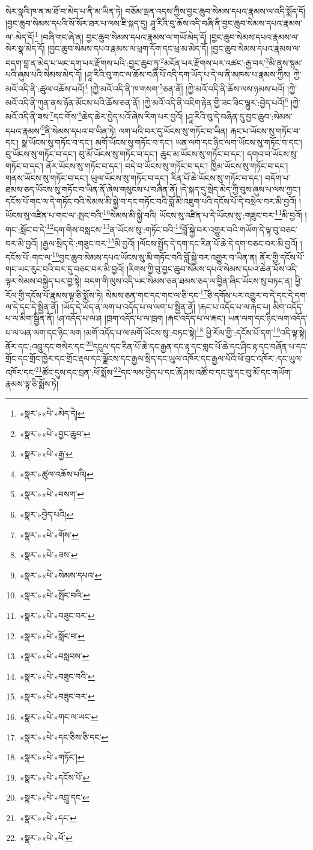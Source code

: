 སེར་སྣའི་ཁ་ན་མ་ཐོ་བ་མེད་པ་ནི་མ་ཡིན་ཏེ། བཅོམ་ལྡན་འདས་ཀྱིས་བྱང་ཆུབ་སེམས་དཔའ་རྣམས་ལ་འདི་སྨོད་དོ། །བྱང་ཆུབ་སེམས་དཔའི་སོ་སོར་ཐར་པ་ལས་ཇི་སྐད་དུ། ཤཱ་རིའི་བུ་ཆོས་འདི་བཞི་ནི་བྱང་ཆུབ་སེམས་དཔའ་རྣམས་ལ་:མེད་དོ།\footnote{«སྣར་»«པེ་»མེད་དེ།} །བཞི་གང་ཞེ་ན། བྱང་ཆུབ་སེམས་དཔའ་རྣམས་ལ་གཡོ་མེད་དོ། །བྱང་ཆུབ་སེམས་དཔའ་རྣམས་ལ་སེར་སྣ་མེད་དོ། །བྱང་ཆུབ་སེམས་དཔའ་རྣམས་ལ་ཕྲག་དོག་དང་ཕྲ་མ་མེད་དོ། །བྱང་ཆུབ་སེམས་དཔའ་རྣམས་ལ་བདག་བླ་ན་མེད་པ་ཡང་དག་པར་རྫོགས་པའི་:བྱང་ཆུབ་ཏུ་\footnote{«སྣར་»«པེ་»བྱང་ཆུབ་}མངོན་པར་རྫོགས་པར་འཚང་:རྒྱ་བར་\footnote{«སྣར་»«པེ་»རྒྱ་}མི་ནུས་སྙམ་པའི་ཞུམ་པའི་སེམས་མེད་དོ། །ཤཱ་རིའི་བུ་གང་ལ་ཆོས་བཞི་པོ་འདི་དག་ཡོད་པ་དེ་ལ་ནི་མཁས་པ་རྣམས་ཀྱིས། ཀྱེ་མའོ་འདི་ནི་:ཚུལ་འཆོས་པའོ།\footnote{«སྣར་»ཚུལ་འཆོས་པའི།} །ཀྱེ་མའོ་འདི་ནི་ཁ་གསག་\footnote{«སྣར་»«པེ་»བསག་}ཅན་ནོ། །ཀྱེ་མའོ་འདི་ནི་ཆོས་ལས་ཉམས་པའོ། །ཀྱེ་མའོ་འདི་ནི་ཀུན་ནས་ཉོན་མོངས་པའི་ཆོས་ཅན་ནོ། །ཀྱེ་མའོ་འདི་ནི་འཇིག་རྟེན་གྱི་ཟང་ཟིང་ལྷུར་:བྱེད་པའོ།\footnote{«སྣར་»བྱེད་པའི།} །ཀྱེ་མའོ་འདི་ནི་ཟས་\footnote{«སྣར་»«པེ་»གོས་}དང་གོས་\footnote{«སྣར་»«པེ་»ཟས་}ཆེད་ཆེར་བྱེད་པའོ་ཞེས་རིག་པར་བྱའོ། །ཤཱ་རིའི་བུ་དེ་བཞིན་དུ་བྱང་ཆུབ་:སེམས་དཔའ་རྣམས་\footnote{«སྣར་»«པེ་»སེམས་དཔའ་}ནི་སེམས་དཔའ་བ་ཡིན་ཏེ། ལག་པའི་བར་དུ་ཡོངས་སུ་གཏོང་བ་ཡིན། རྐང་པ་ཡོངས་སུ་གཏོང་བ་དང་། སྣ་ཡོངས་སུ་གཏོང་བ་དང་། མགོ་ཡོངས་སུ་གཏོང་བ་དང་། ཡན་ལག་དང་ཉིང་ལག་ཡོངས་སུ་གཏོང་བ་དང་། བུ་ཡོངས་སུ་གཏོང་བ་དང་། བུ་མོ་ཡོངས་སུ་གཏོང་བ་དང་། ཆུང་མ་ཡོངས་སུ་གཏོང་བ་དང་། དགའ་བ་ཡོངས་སུ་གཏོང་བ་དང་། ནོར་ཡོངས་སུ་གཏོང་བ་དང་། བདེ་བ་ཡོངས་སུ་གཏོང་བ་དང་། ཁྱིམ་ཡོངས་སུ་གཏོང་བ་དང་། གནས་ཡོངས་སུ་གཏོང་བ་དང་། ཡུལ་ཡོངས་སུ་གཏོང་བ་དང་། རིན་པོ་ཆེ་ཡོངས་སུ་གཏོང་བ་དང་། བདོག་པ་ཐམས་ཅད་ཡོངས་སུ་གཏོང་བ་ཡིན་ནོ་ཞེས་གསུངས་པ་བཞིན་ནོ། །དེ་སྐད་དུ་སྲེད་མེད་ཀྱི་བུས་ཞུས་པ་ལས་ཀྱང་། དངོས་པོ་གང་ལ་དེ་གཏོང་བའི་སེམས་མི་སྐྱེ་བ་དང་གཏོང་བའི་བློ་མི་འཇུག་པའི་དངོས་པོ་དེ་བསྲེལ་བར་མི་བྱའོ། །ཡོངས་སུ་འཛིན་པ་གང་ལ་:སྤང་བའི་\footnote{«སྣར་»«པེ་»སྤོང་བའི་}སེམས་མི་སྐྱེ་བའི། ཡོངས་སུ་འཛིན་པ་དེ་ཡོངས་སུ་:གཟུང་བར་\footnote{«སྣར་»«པེ་»བཟུང་བར་}མི་བྱའོ། །གང་:སློང་བ་དེ་\footnote{«སྣར་»«པེ་»སློང་བ་}དག་གིས་བསླངས་\footnote{«སྣར་»«པེ་»བསླབས་}ན་ཡོངས་སུ་:གཏོང་བའི་\footnote{«སྣར་»«པེ་»བཟུང་བའི་}བློ་སྐྱེ་བར་འགྱུར་བའི་གཡོག་དེ་ལྟ་བུ་བཅང་བར་མི་བྱའོ། །རྒྱལ་སྲིད་དེ་:གཟུང་བར་\footnote{«སྣར་»«པེ་»བཟུང་བར་}མི་བྱའོ། །ལོངས་སྤྱོད་དེ་དག་དང་རིན་པོ་ཆེ་དེ་དག་བཅང་བར་མི་བྱའོ། །དངོས་པོ་:གང་ལ་\footnote{«སྣར་»«པེ་»གང་ལ་ཡང་}བྱང་ཆུབ་སེམས་དཔའ་ཡོངས་སུ་མི་གཏོང་བའི་བློ་སྐྱེ་བར་འགྱུར་བ་ཡིན་ན། ནོར་གྱི་དངོས་པོ་གང་ཡང་རུང་བའི་བར་དུ་བཅང་བར་མི་བྱའོ། །རིགས་ཀྱི་བུ་བྱང་ཆུབ་སེམས་དཔའ་སེམས་དཔའ་ཆེན་པོས་འདི་ལྟར་སེམས་བསྐྱེད་པར་བྱ་སྟེ། བདག་གི་ལུས་འདི་ཡང་སེམས་ཅན་ཐམས་ཅད་ལ་བྱིན་ཞིང་ཡོངས་སུ་བཏང་ན། ཕྱི་རོལ་གྱི་དངོས་པོ་རྣམས་ལྟ་ཅི་སྨོས་ཏེ། སེམས་ཅན་གང་དང་གང་ལ་ཅི་དང་\footnote{«སྣར་»«པེ་»དང་ཅིས་ཅི་དང་}ཅི་དགོས་པར་འགྱུར་བ་དེ་དང་དེ་དག་ལ་དེ་དང་དེ་སྦྱིན་ནོ། །ཡོད་དེ་ཡོད་ན་ལག་པ་འདོད་པ་ལ་ལག་པ་སྦྱིན་ནོ། །རྐང་པ་འདོད་པ་ལ་རྐང་པ། མིག་འདོད་པ་ལ་མིག་སྦྱིན་ནོ། །ཤ་འདོད་པ་ལ་ཤ །ཁྲག་འདོད་པ་ལ་ཁྲག །རྐང་འདོད་པ་ལ་རྐང་། ཡན་ལག་དང་ཉིང་ལག་འདོད་པ་ལ་ཡན་ལག་དང་ཉིང་ལག །མགོ་འདོད་པ་ལ་མགོ་ཡོངས་སུ་:བཏང་སྟེ།\footnote{«སྣར་»«པེ་»གཏོང་།} ཕྱི་རོལ་གྱི་:དངོས་པོ་དག་\footnote{«སྣར་»«པེ་»དངོས་པོ་}འདི་ལྟ་སྟེ། ནོར་དང་:འབྲུ་དང་གསེར་དང་\footnote{«སྣར་»«པེ་»འབྲུ་དང་}དངུལ་དང་རིན་པོ་ཆེ་དང་རྒྱན་དང་རྟ་དང་གླང་པོ་ཆེ་དང་ཤིང་རྟ་དང་བཞོན་པ་དང་གྲོང་དང་གྲོང་ཁྱེར་དང་གྲོང་རྡལ་དང་ལྗོངས་དང་རྒྱལ་སྲིད་དང་ཡུལ་འཁོར་དང་རྒྱལ་པོའི་ཕོ་བྲང་འཁོར་:དང་ཡུལ་འཁོར་དང་\footnote{«སྣར་»«པེ་»དང་}ཚོང་དུས་དང་བྲན་:ཕོ་སྨོས་\footnote{«སྣར་»«པེ་»ཕོ་}དང་ལས་བྱེད་པ་དང་ཞོ་ཤས་འཚོ་བ་དང་བུ་དང་བུ་མོ་དང་གཡོག་རྣམས་ལྟ་ཅི་སྨོས་ཏེ། 